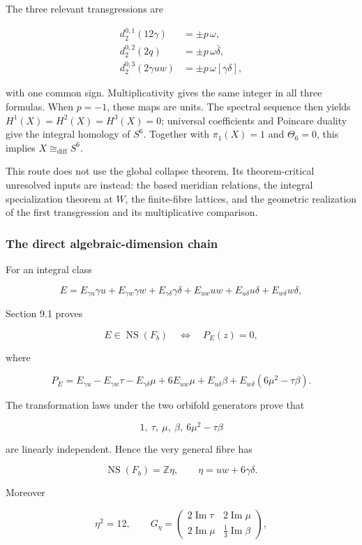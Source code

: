 \documentclass[
  10pt,
  letterpaper,
]{article}
\begin{document}
The three relevant transgressions are

\[
\begin{aligned}
d_2^{0,1}(12\gamma)&=\pm p\,\omega,\\
d_2^{0,2}(2q)&=\pm p\,\omega\bar\delta,\\
d_2^{0,3}(2\gamma uw)&=\pm p\,\omega[\gamma\delta],
\end{aligned}
\]

with one common sign. Multiplicativity gives the same integer in all
three formulas. When \(p=-1\), these maps are units. The spectral
sequence then yields \(H^1(X)=H^2(X)=H^3(X)=0\); universal coefficients
and Poincare duality give the integral homology of \(S^6\). Together
with \(\pi_1(X)=1\) and \(\Theta_6=0\), this implies
\(X\cong_{\mathrm{diff}}S^6\).

This route does not use the global collapse theorem. Its
theorem-critical unresolved inputs are instead: the based meridian
relations, the integral specialization theorem at \(W\), the
finite-fibre lattices, and the geometric realization of the first
transgression and its multiplicative comparison.

\subsubsection{The direct algebraic-dimension
chain}\label{the-direct-algebraic-dimension-chain}

For an integral class

\[
E=E_{\gamma u}\gamma u+E_{\gamma w}\gamma w+E_{\gamma\delta}\gamma\delta
  +E_{uw}uw+E_{u\delta}u\delta+E_{w\delta}w\delta,
\]

Section 9.1 proves

\[
E\in\operatorname{NS}(F_b)
\quad\Longleftrightarrow\quad
P_E(z)=0,
\]

where

\[
P_E=E_{\gamma u}-E_{\gamma w}\tau-E_{\gamma\delta}\mu
 +6E_{uw}\mu+E_{u\delta}\beta+E_{w\delta}(6\mu^2-\tau\beta).
\]

The transformation laws under the two orbifold generators prove that

\[
1,\ \tau,\ \mu,\ \beta,\ 6\mu^2-\tau\beta
\]

are linearly independent. Hence the very general fibre has

\[
\operatorname{NS}(F_b)=\mathbb Z\eta,
\qquad
\eta=uw+6\gamma\delta.
\]

Moreover

\[
\eta^2=12,
\qquad
G_\eta=
\begin{pmatrix}
2\operatorname{Im}\tau&2\operatorname{Im}\mu\\
2\operatorname{Im}\mu&\frac13\operatorname{Im}\beta
\end{pmatrix},
\]
\end{document}
